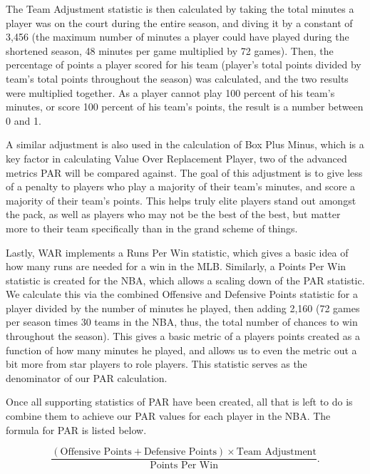 \documentclass[12pt]{article}
\begin{document}
The Team Adjustment statistic 
is then calculated by taking the total minutes a player was on the court 
during the entire season, and diving 
it by a constant of 3,456 (the maximum number of minutes a player could 
have played during the shortened 
season, 48 minutes per game multiplied by 72 games). Then, the 
percentage of points a player scored for 
his team (player's total points divided by team's total points throughout the 
season) was calculated, and the 
two results were multiplied together. As a player cannot play 100 percent 
of his team's minutes, or score 
100 percent of his team's points, the result is a number between 0 and 1. 

A similar adjustment is also used 
in the calculation of Box Plus Minus, which is a key factor in calculating 
Value Over Replacement Player, 
two of the advanced metrics PAR will be compared against. The goal of 
this adjustment is to give less of a 
penalty to players who play a majority of their team's minutes, and score a 
majority of their team's points. 
This helps truly elite players stand out amongst the pack, as well as 
players who may not be the best of the 
best, but matter more to their team specifically than in the grand scheme 
of things.

Lastly, WAR implements a Runs Per Win statistic, which gives a basic 
idea of how many runs are needed 
for a win in the MLB. Similarly, a Points Per Win statistic is created for the 
NBA, which allows a scaling 
down of the PAR statistic. We calculate this via the combined Offensive 
and Defensive Points statistic for a 
player divided by the number of minutes he played, then adding 2,160 (72 
games per season times 30 
teams in the NBA, thus, the total number of chances to win throughout the 
season). This gives a basic 
metric of a players points created as a function of how many minutes he 
played, and allows us to even the 
metric out a bit more from star players to role players. This statistic serves 
as the denominator of our PAR 
calculation.

Once all supporting statistics of PAR have been created, all that is left to 
do is combine them to achieve our PAR values for each player in the 
NBA. The formula for PAR is listed below.

\begin{equation}
 \label{eq:PAR}
  \frac{(\text{Offensive Points} + \text{Defensive Points}) \times \text{Team Adjustment}}
  {\text{Points Per Win}}.
\end{equation}
\end{document}
